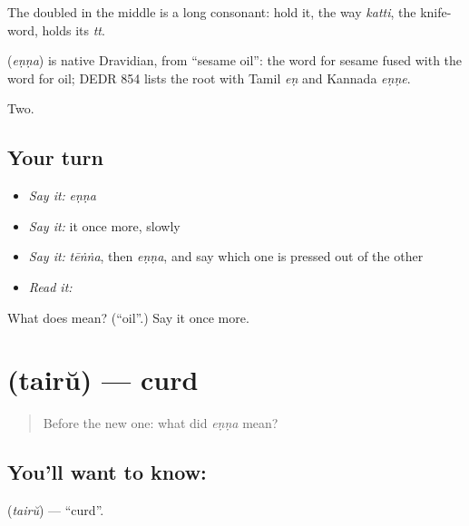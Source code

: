 The doubled  in the middle is a long consonant: hold it, the way \emph{katti}, the knife-word, holds its \emph{tt}.

\begin{cousinweb}
\textbf{} (\emph{eṇṇa}) is native Dravidian, from \textquotedblleft{}sesame oil\textquotedblright{}: the word for sesame fused with the word for oil; DEDR 854 lists the root with Tamil \emph{eṇ} and Kannada \emph{eṇṇe}.
\end{cousinweb}

\begin{grammarlens}[title={What you've built}]
Two.
\end{grammarlens}

\subsection*{Your turn}
\begin{itemize}
\raggedright
  \item \emph{Say it:} \emph{eṇṇa}
  \item \emph{Say it:} it once more, slowly
  \item \emph{Say it:} \emph{tēṅṅa}, then \emph{eṇṇa}, and say which one is pressed out of the other
  \item \emph{Read it:} \textbf{}
\end{itemize}

\begin{tcolorbox}[breakable,colback=teal!4,colframe=teal!35!black,title={Before you move on}]
What does  mean? (\textquotedblleft{}oil\textquotedblright{}.) Say it once more.
\end{tcolorbox}
\section[\texorpdfstring{\ml{തൈര്} (tairŭ)}{തൈര് (tairŭ)}]{ (tairŭ) — curd}

\label{lesson:ML-C61-curd}



\begin{quote}
Before the new one: what did \emph{eṇṇa} mean?
\end{quote}

\subsection*{You'll want to know: }
\textbf{} (\emph{tairŭ}) — \textquotedblleft{}curd\textquotedblright{}.

